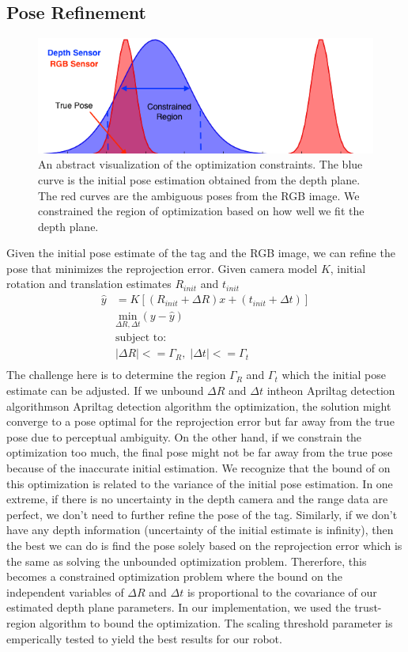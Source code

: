 \subsection{Pose Refinement}
\begin{figure}
\centering
\includegraphics[width=\columnwidth]{figs/optimization_visualization_fig}
\caption{An abstract visualization of the optimization constraints. The blue curve is the initial pose estimation obtained from the depth plane. The red curves are the ambiguous poses from the RGB image. We constrained the region of optimization based on how well we fit the depth plane.}
\label{fig:calib}
\end{figure}
Given the initial pose estimate of the tag and the RGB image, we can refine the pose that minimizes the reprojection error. Given camera model $K$, initial rotation and translation estimates $R_{init}$ and $t_{init}$
\begin{align*}
\hat{y} &= K[(R_{init} + \Delta R)x + (t_{init} + \Delta t)]\\
&\underset{\Delta R, \Delta t}{\mathrm{min}} (y - \hat{y})\\
&\text{subject to:} \\
& |\Delta R| <= \Gamma_R, \; |\Delta t| <= \Gamma_t\\
\end{align*}
The challenge here is to determine the region $\Gamma_R$ and $\Gamma_t$ which the initial pose estimate can be adjusted. If we unbound $\Delta R$ and $\Delta t$ intheon Apriltag detection algorithmson Apriltag detection algorithm the optimization, the solution might converge to a pose optimal for the reprojection error but far away from the true pose due to perceptual ambiguity. On the other hand, if we constrain the optimization too much, the final pose might not be far away from the true pose because of the inaccurate initial estimation. We recognize that the bound of on this optimization is related to the variance of the initial pose estimation. In one extreme, if there is no uncertainty in the depth camera and the range data are perfect, we don't need to further refine the pose of the tag. Similarly, if we don't have any depth information (uncertainty of the initial estimate is infinity), then the best we can do is find the pose solely based on the reprojection error which is the same as solving the unbounded optimization problem. Thererfore, this becomes a constrained optimization problem where the bound on the independent variables of $\Delta R$ and $\Delta t$ is proportional to the covariance of our estimated depth plane parameters. In our implementation, we used the trust-region algorithm to bound the optimization. The scaling threshold parameter is emperically tested to yield the best results for our robot. 

